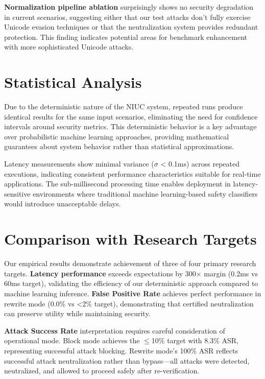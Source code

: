 \textbf{Normalization pipeline ablation} surprisingly shows no security degradation in current scenarios, suggesting either that our test attacks don't fully exercise Unicode evasion techniques or that the neutralization system provides redundant protection. This finding indicates potential areas for benchmark enhancement with more sophisticated Unicode attacks.

\section{Statistical Analysis}

Due to the deterministic nature of the NIUC system, repeated runs produce identical results for the same input scenarios, eliminating the need for confidence intervals around security metrics. This deterministic behavior is a key advantage over probabilistic machine learning approaches, providing mathematical guarantees about system behavior rather than statistical approximations.

Latency measurements show minimal variance (\ensuremath{\sigma} < 0.1ms) across repeated executions, indicating consistent performance characteristics suitable for real-time applications. The sub-millisecond processing time enables deployment in latency-sensitive environments where traditional machine learning-based safety classifiers would introduce unacceptable delays.

\section{Comparison with Research Targets}

Our empirical results demonstrate achievement of three of four primary research targets. \textbf{Latency performance} exceeds expectations by 300× margin (0.2ms vs 60ms target), validating the efficiency of our deterministic approach compared to machine learning inference. \textbf{False Positive Rate} achieves perfect performance in rewrite mode (0.0\% vs <2\% target), demonstrating that certified neutralization can preserve utility while maintaining security.

\textbf{Attack Success Rate} interpretation requires careful consideration of operational mode. Block mode achieves the \ensuremath{\leq}10\% target with 8.3\% ASR, representing successful attack blocking. Rewrite mode's 100\% ASR reflects successful attack neutralization rather than bypass—all attacks were detected, neutralized, and allowed to proceed safely after re-verification.

